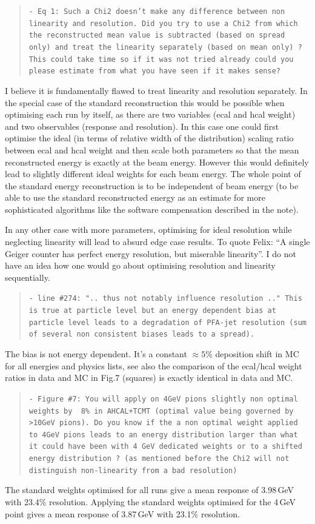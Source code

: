 \documentclass[twoside,a4paper,12pt]{article}
\begin{document}
\begin{quote}\texttt{- Eq 1: Such a Chi2 doesn't make any difference between non linearity and resolution. Did you try to use a Chi2 from which the reconstructed mean value is subtracted (based on spread only) and treat the linearity separately (based on mean only) ?
This could take time so if it was not tried already could you please estimate from what you have seen if it makes sense?}\end{quote}
I believe it is fundamentally flawed to treat linearity and resolution separately. In the special case of the standard reconstruction this would be possible when optimising each run by itself, as there are two variables (ecal and hcal weight) and two observables (response and resolution). In this case one could first optimise the ideal (in terms of relative width of the distribution) scaling ratio between ecal and hcal weight and then scale both parameters so that the mean reconstructed energy is exactly at the beam energy. However this would definitely lead to slightly different ideal weights for each beam energy. The whole point of the standard energy reconstruction is to be independent of beam energy (to be able to use the standard reconstructed energy as an estimate for more sophisticated algorithms like the software compensation described in the note).

In any other case with more parameters, optimising for ideal resolution while neglecting linearity will lead to absurd edge case results. To quote Felix: ``A single Geiger counter has perfect energy resolution, but miserable linearity''. I do not have an idea how one would go about optimising resolution and linearity sequentially.

\begin{quote}\texttt{- line \#274: ".. thus not notably influence resolution .."
This is true at particle level but an energy dependent bias at particle level leads to a degradation of PFA-jet resolution (sum of several non consistent biases leads to a spread).}\end{quote}
The bias is not energy dependent. It's a constant $\approx5\%$ deposition shift in MC for all energies and physics lists, see also the comparison of the ecal/hcal weight ratios in data and MC in Fig.7 (squares) is exactly identical in data and MC.

\begin{quote}\texttt{- Figure \#7:
You will apply on 4GeV pions slightly non optimal weights by ~8\% in AHCAL+TCMT (optimal value being governed by >10GeV pions).
Do you know if the a non optimal weight applied to 4GeV pions leads to an energy distribution larger than what it could have been with 4 GeV dedicated weights or to a shifted energy distribution ? (as mentioned before the Chi2 will not distinguish non-linearity from a bad resolution)}\end{quote}
The standard weights optimised for all runs give a mean response of 3.98\,GeV with 23.4\% resolution. Applying the standard weights optimised for the 4\,GeV point gives a mean response of 3.87\,GeV with 23.1\% resolution.
\end{document}
